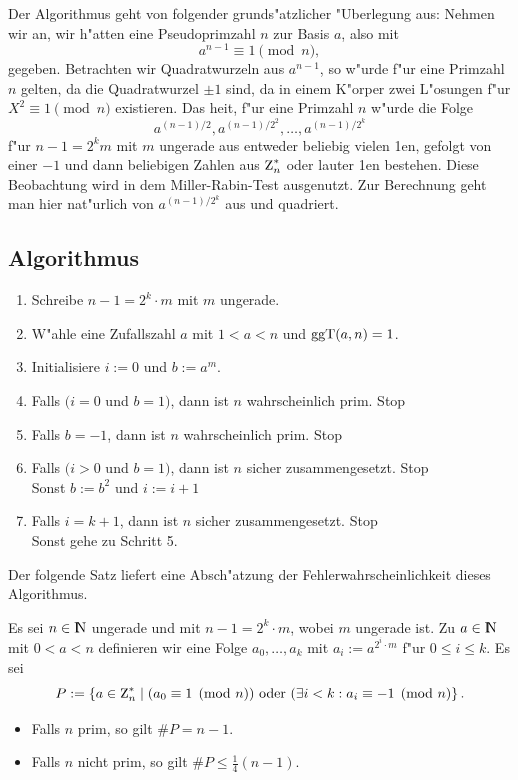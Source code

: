 Der Algorithmus geht von folgender grunds"atzlicher "Uberlegung aus:
Nehmen wir an, wir h"atten eine Pseudoprimzahl $n$ zur Basis $a$, also
mit
$$ a^{n-1} \equiv 1 \pmod{n}, $$ 
gegeben. Betrachten wir Quadratwurzeln aus $a^{n-1}$, so w"urde f"ur eine 
Primzahl $n$ gelten, da\3 die Quadratwurzel $\pm 1$ sind, da in einem K"orper 
zwei L"osungen f"ur $X^2 \equiv 1 \pmod{n}$ existieren. Das hei\3t, f"ur 
eine Primzahl $n$ w"urde die Folge
$$ a^{(n-1)/2}, a^{(n-1)/2^2},\ldots,a^{(n-1)/2^k} $$ 
f"ur $n-1 = 2^k m$ mit $m$ ungerade aus entweder beliebig vielen 1en, gefolgt von
einer $-1$ und dann beliebigen Zahlen aus $\einheit{n}$ oder lauter
1en bestehen. Diese Beobachtung wird in dem Miller-Rabin-Test
ausgenutzt. Zur Berechnung geht man hier nat"urlich von
$a^{(n-1)/2^k}$ aus und quadriert.

\subsection*{Algorithmus}

\begin{enumerate}
  \item Schreibe $n-1 = 2^k \cdot m$ mit $m$ ungerade.
  \item W"ahle eine Zufallszahl $a$ mit $1<a<n$ und $\mbox{ggT}(a,n)=1$.
  \item Initialisiere $i:=0$ und $b:=a^m$.
  \item Falls $(i=0$ und $b=1)$, dann ist $n$ wahrscheinlich prim. Stop
  \item Falls $b=-1$, dann ist $n$ wahrscheinlich prim. Stop
  \item Falls $(i>0$ und $b=1)$, dann ist $n$ sicher zusammengesetzt. Stop \\
        Sonst $b:=b^2$ und $i:=i+1$
  \item Falls $i=k+1$, dann ist $n$ sicher zusammengesetzt. Stop \\ 
        Sonst gehe zu Schritt 5.
\end{enumerate}

Der folgende Satz liefert eine Absch"atzung der
Fehlerwahrscheinlichkeit dieses Algorithmus.

\begin{satz}[Rabin]
  Es sei $n\in\N$ ungerade und mit $n-1=2^k \cdot m$, wobei $m$
  ungerade ist. Zu $a\in\N$ mit $0<a<n$ definieren wir eine Folge
  $a_0,\ldots,a_k$ mit
  $a_i := a^{2^i \cdot m}$ f"ur $0\le i\le k$.
  Es sei 
    $$ P:=\left\{a\in\einheit{n} \mid (a_0 \equiv 1 \pmod{n}) \mbox{
       oder } (\exists i<k : a_i \equiv -1 \pmod{n}\right\}. $$
  \begin{itemize}
    \item Falls $n$ prim, so gilt $\#P = n-1$.
    \item Falls $n$ nicht prim, so gilt $\#P \le \frac{1}{4}(n-1)$.
  \end{itemize}
\end{satz}  


